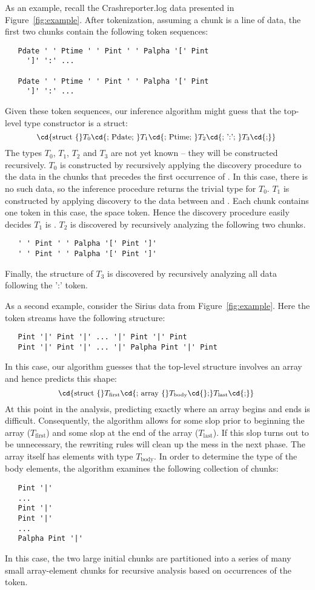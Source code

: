 As an example, recall the Crashreporter.log data presented in
Figure~\ref{fig:example}.  After tokenization, assuming a chunk is
a line of data, the first two chunks contain the following token sequences:
{\small
\begin{verbatim}
   Pdate ' ' Ptime ' ' Pint ' ' Palpha '[' Pint 
     ']' ':' ...

   Pdate ' ' Ptime ' ' Pint ' ' Palpha '[' Pint 
     ']' ':' ...
\end{verbatim}
}
\noindent
Given these token sequences, our inference algorithm might guess that
the top-level type constructor is a struct:  
\[
\mbox{\small
\cd{struct \{}$T_0$\cd{; Pdate; }$T_1$\cd{; Ptime; }$T_2$\cd{; ':'; }$T_3$\cd{;\}}
}
\]
The types $T_0$, $T_1$, $T_2$ and $T_3$ are not yet known -- they will
be constructed recursively.  $T_0$ is constructed by recursively applying
the discovery procedure to the data in the chunks that precedes
the first occurrence of .  In this case, there is no such
data, so the inference procedure returns the trivial type  for
$T_0$.  $T_1$ is constructed by applying discovery to the data between
 and .  Each chunk contains one token in this case,
the space token.  Hence the discovery procedure easily decides
$T_1$ is . $T_2$ is discovered by recursively analyzing the following
two chunks.
{\small
\begin{verbatim}
   ' ' Pint ' ' Palpha '[' Pint ']' 
   ' ' Pint ' ' Palpha '[' Pint ']'
\end{verbatim}
}
\noindent
Finally, the structure of $T_3$ is discovered by recursively analyzing 
all data following the ':' token.

As a second example, consider the Sirius data from Figure~\ref{fig:example}.
Here the token streams have the following structure:
{\small
\begin{verbatim}
   Pint '|' Pint '|' ... '|' Pint '|' Pint
   Pint '|' Pint '|' ... '|' Palpha Pint '|' Pint
\end{verbatim}
}
\noindent
In this case, our algorithm guesses that the top-level structure involves
an array and hence predicts this shape:
\[
\mbox{\small
\cd{struct \{}$T_{\mathrm{first}}$\cd{; array \{}$T_{\mathrm{body}}$\cd{\};}$T_{\mathrm{last}}$\cd{;\}}
}
\]
\noindent
At this point in the analysis, predicting exactly where an array
begins and ends is difficult.  Consequently, the algorithm allows for
some slop prior to beginning the array ($T_{\mathrm{first}}$) and some
slop at the end of the array ($T_{\mathrm{last}}$).  If this slop
turns out to be unnecessary, the rewriting rules will clean up the
mess in the next phase.  The array itself has elements with type
$T_{\mathrm{body}}$.  In order to determine the type of the body
elements, the algorithm examines the following collection of chunks:
{\small
\begin{verbatim}
   Pint '|' 
   ... 
   Pint '|' 
   Pint '|'
   ...
   Palpha Pint '|'
\end{verbatim}
}
\noindent
In this case, the two large initial chunks are partitioned 
into a series of many small array-element chunks for recursive 
analysis based on occurrences of the  token.

